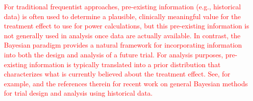 \documentclass[12pt]{article}
\begin{document}
\textcolor{red}{
%
For traditional frequentist approaches, pre-existing information (e.g., historical data) is often used to determine a plausible, clinically meaningful 
value for the treatment effect to use for power calculations, but this pre-existing information is not generally used in analysis once data are actually available.
%
In contrast, the Bayesian paradigm provides a natural framework for incorporating information into both the design and analysis of a future trial.
%
For analysis purposes, pre-existing information is typically translated into a prior distribution that characterizes what is currently believed about the treatment effect.
%
See, for example, \cite{Psioda2018} and the references therein for recent work on general Bayesian methods for trial design and analysis using historical data.
%
%
%
}

%
\end{document}
